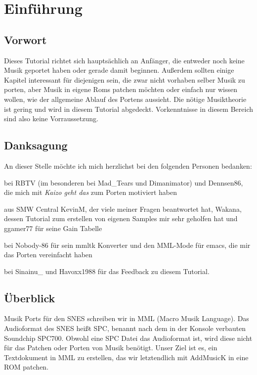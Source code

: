 

\section{Einführung}

\subsection{Vorwort}
Dieses Tutorial richtet sich hauptsächlich an Anfänger, die entweder noch keine Musik geportet haben oder gerade damit beginnen. Außerdem sollten einige Kapitel interessant für diejenigen sein, die zwar nicht vorhaben selber Musik zu porten, aber Musik in eigene Roms patchen möchten oder einfach nur wissen wollen, wie der allgemeine Ablauf des Portens aussieht.
Die nötige Musiktheorie ist gering und wird in diesem Tutorial abgedeckt. Vorkenntnisse in diesem Bereich sind also keine Vorraussetzung.

\subsection*{Danksagung}

An dieser Stelle möchte ich mich herzlichst bei den folgenden Personen bedanken:

\medskip

bei RBTV (im besonderen bei Mad\_Tears und Dimanimator) und Dennsen86, die mich mit \textit{Kaizo geht das} zum Porten motiviert haben

\medskip

aus SMW Central KevinM, der viele meiner Fragen beantwortet hat, Wakana, dessen Tutorial zum erstellen von eigenen Samples mir sehr geholfen hat und ggamer77 für seine Gain Tabelle

\medskip

bei Nobody-86 für sein mmltk Konverter und den MML-Mode für emacs, die mir das Porten vereinfacht haben

\medskip

bei Sinainu\_ und Havoxx1988 für das Feedback zu diesem Tutorial.


\newpage

\subsection{Überblick}

Musik Ports für den SNES schreiben wir in MML (Macro Musik Language). Das Audioformat des SNES heißt SPC, benannt nach dem in der Konsole verbauten Soundchip SPC700.
Obwohl eine SPC Datei das Audioformat ist, wird diese nicht für das Patchen oder Porten von Musik benötigt. Unser Ziel ist es, ein Textdokument in MML zu erstellen, das wir letztendlich mit AddMusicK in eine ROM patchen.


